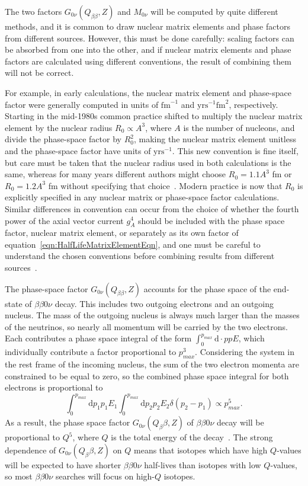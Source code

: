 The two factors $G_{0\nu}(Q_{\beta\beta}, Z)$ and $M_{0\nu}$ will be computed by quite different methods, and it is common to draw nuclear matrix elements and phase factors from different sources.  However, this must be done carefully: scaling factors can be absorbed from one into the other, and if nuclear matrix elements and phase factors are calculated using different conventions, the result of combining them will not be correct.

For example, in early calculations, the nuclear matrix element and phase-space factor were generally computed in units of $\mathrm{fm}^{-1}$ and $\mathrm{yrs}^{-1} \mathrm{fm}^2$, respectively.  Starting in the mid-1980s common practice shifted to multiply the nuclear matrix element by the nuclear radius $R_0 \propto A^3$, where $A$ is the number of nucleons, and divide the phase-space factor by $R_0^2$, making the nuclear matrix element unitless and the phase-space factor have units of $\mathrm{yrs}^{-1}$.  This new convention is fine itself, but care must be taken that the nuclear radius used in both calculations is the same, whereas for many years different authors might choose $R_0 = 1.1 A^3$ fm or $R_0 = 1.2 A^3$ fm without specifying that choice~\cite{PhysRevC.73.028501}.  Modern practice is now that $R_0$ is explicitly specified in any nuclear matrix or phase-space factor calculations.  Similar differences in convention can occur from the choice of whether the fourth power of the axial vector current $g_A^4$ should be included with the phase space factor, nuclear matrix element, or separately as its own factor of equation~\ref{eqn:HalfLifeMatrixElementEqn}, and one must be careful to understand the chosen conventions before combining results from different sources~\cite{PhysRevC.87.014315}.

The phase-space factor $G_{0\nu}(Q_{\beta\beta}, Z)$ accounts for the phase space of the end-state of $\beta\beta 0\nu$ decay.  This includes two outgoing electrons and an outgoing nucleus.  The mass of the outgoing nucleus is always much larger than the masses of the neutrinos, so nearly all momentum will be carried by the two electrons.  Each contributes a phase space integral of the form $\int_0^{p_{max}} \mathrm{d}\cdot p pE$, which individually contribute a factor proportional to $p_{max}^3$.  Considering the system in the rest frame of the incoming nucleus, the sum of the two electron momenta are constrained to be equal to zero, so the combined phase space integral for both electrons is proportional to
\begin{equation}
\int_0^{p_{max}} \mathrm{d}p_1 p_1E_1 \int_0^{p_{max}} \mathrm{d}p_2 p_2E_2 \delta(p_2-p_1) \propto p_{max}^5.
\end{equation}
As a result, the phase space factor $G_{0\nu}(Q_\beta\beta, Z)$ of $\beta\beta 0\nu$ decay will be proportional to $Q^5$, where $Q$ is the total energy of the decay~\cite{mohapatra1998massive}.  The strong dependence of $G_{0\nu}(Q_\beta\beta, Z)$ on $Q$ means that isotopes which have high $Q$-values will be expected to have shorter $\beta\beta 0\nu$ half-lives than isotopes with low $Q$-values, so most $\beta\beta 0\nu$ searches will focus on high-$Q$ isotopes.

